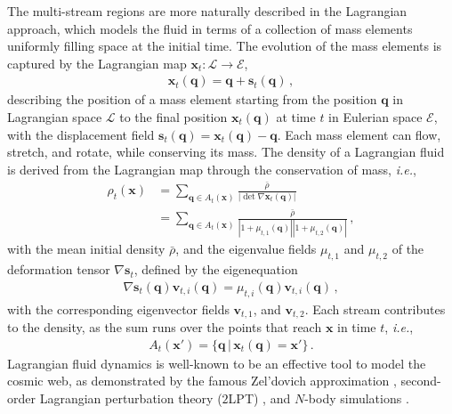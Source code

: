 \documentclass[a4paper, 11pt]{article}
\begin{document}
The multi-stream regions are more naturally described in the Lagrangian approach, which models the fluid in terms of a collection of mass elements uniformly filling space at the initial time. The evolution of the mass elements is captured by the Lagrangian map $\bm{x}_t:\mathcal{L}\to \mathcal{E}$,
\begin{align}
\bm{x}_t(\bm{q}) = \bm{q} + \bm{s}_t(\bm{q})\,,
\end{align}
describing the position of a mass element starting from the position $\bm{q}$ in Lagrangian space $\mathcal{L}$ to the final position $\bm{x}_t(\bm{q})$ at time $t$ in Eulerian space $\mathcal{E}$, with the displacement field $\bm{s}_t(\bm{q})= \bm{x}_t(\bm{q}) - \bm{q}$. Each mass element can flow, stretch, and rotate, while conserving its mass. The density of a Lagrangian fluid is derived from the Lagrangian map through the conservation of mass, \textit{i.e.},
\begin{align}
\rho_t(\bm{x})
&= \sum_{\bm{q} \in A_t(\bm{x})} \frac{\bar{\rho}}{|\det \nabla \bm{x}_t(\bm{q})|}\nonumber\\
&= \sum_{\bm{q} \in A_t(\bm{x})} \frac{\bar{\rho}}{|1+\mu_{t,1}(\bm{q})||1+\mu_{t,2}(\bm{q})|}\,,
\label{eq:density}
\end{align}
with the mean initial density $\bar{\rho}$, and the eigenvalue fields $\mu_{t,1}$ and $\mu_{t,2}$ of the deformation tensor $\nabla \bm{s}_t$, defined by the eigenequation
\begin{align}
\nabla \bm{s}_t(\bm{q}) \bm{v}_{t,i}(\bm{q}) = \mu_{t,i}(\bm{q}) \bm{v}_{t,i}(\bm{q})\,,
\label{eq:EigenvalueAndEigenvector}
\end{align} 
with the corresponding eigenvector fields $\bm{v}_{t,1}$, and $\bm{v}_{t,2}$. Each stream contributes to the density, as the sum runs over the points that reach $\bm{x}$ in time $t$, \textit{i.e.},
\begin{align}
A_t(\bm{x}') = \{\bm{q}\,|\,\bm{x}_t(\bm{q})=\bm{x}'\}\,.
\end{align} 
Lagrangian fluid dynamics is well-known to be an effective tool to model the cosmic web, as demonstrated by the famous Zel'dovich approximation \cite{Zeldovich:1970}, second-order Lagrangian perturbation theory ($2$LPT) \cite{Buchert:1992, Buchert:1993a, Buchert:1993b, Buchert:1994a, Buchert:1994b, Bouchet:1995}, and $N$-body simulations \cite{Springel:2005, illustris:2014, eagle:2015, ABACUSSUMMIT:2021, Quijote:2020}. 
\end{document}
